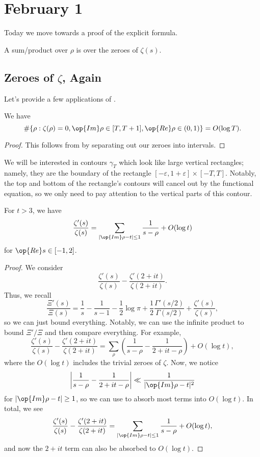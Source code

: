 \documentclass[../notes.tex]{subfiles}
\begin{document}
\section{February 1}

Today we move towards a proof of the explicit formula.
\begin{notation}
	A sum/product over $\rho$ is over the zeroes of $\zeta(s)$.
\end{notation}

\subsection{Zeroes of \texorpdfstring{$\zeta$}{ Zeta}, Again}
Let's provide a few applications of .
\begin{corollary} \label{cor:bound-number-zeroes-small}
	We have
	\[\#\{\rho:\zeta(\rho)=0,\op{Im}\rho\in[T,T+1],\op{Re}\rho\in(0,1)\}=O(\log T).\]
\end{corollary}
\begin{proof}
	This follows from  by separating out our zeroes into intervals.
\end{proof}
We will be interested in contours $\gamma_T$ which look like large vertical rectangles; namely, they are the boundary of the rectangle $[-\varepsilon,1+\varepsilon]\times[-T,T]$. Notably, the top and bottom of the rectangle's contours will cancel out by the functional equation, so we only need to pay attention to the vertical parts of this contour.
\begin{lemma} \label{lem:get-log-deriv-zeta}
	For $t>3$, we have
	\[\frac{\zeta'(s)}{\zeta(s)}=\sum_{|\op{Im}\rho-t|\le1}\frac1{s-\rho}+O(\log t)\]
	for $\op{Re}s\in[-1,2]$. 
\end{lemma}
\begin{proof}
	We consider
	\[\frac{\zeta'(s)}{\zeta(s)}-\frac{\zeta'(2+it)}{\zeta(2+it)}.\]
	Thus, we recall
	\[\frac{\Xi'(s)}{\Xi(s)}=\frac1s-\frac1{s-1}-\frac12\log\pi+\frac12\frac{\Gamma'(s/2)}{\Gamma(s/2)}+\frac{\zeta'(s)}{\zeta(s)},\]
	so we can just bound everything. Notably, we can use the infinite product to bound $\Xi'/\Xi$ and then compare everything. For example,
	\[\frac{\zeta'(s)}{\zeta(s)}-\frac{\zeta'(2+it)}{\zeta(2+it)}=\sum_\rho\left(\frac1{s-\rho}-\frac1{2+it-\rho}\right)+O(\log t),\]
	where the $O(\log t)$ includes the trivial zeroes of $\zeta$. Now, we notice
	\[\left|\frac1{s-\rho}-\frac1{2+it-\rho}\right|\ll\frac1{|\op{Im}\rho-t|^2}\]
	for $|\op{Im}\rho-t|\ge1$, so we can use  to absorb most terms into $O(\log t)$. In total, we see
	\[\frac{\zeta'(s)}{\zeta(s)}-\frac{\zeta'(2+it)}{\zeta(2+it)}=\sum_{|\op{Im}\rho-t|\le1}\frac1{s-\rho}+O(\log t),\]
	and now the $2+it$ term can also be absorbed to $O(\log t)$.
\end{proof}
\end{document}
